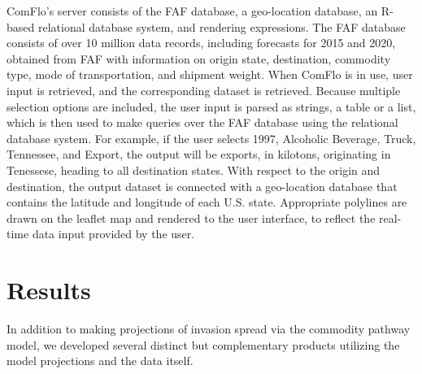 \documentclass[12pt]{article}
\begin{document}
ComFlo's server consists of the FAF database, a geo-location database, an R-based relational database system, and rendering expressions. The FAF database consists of over 10 million data records, including forecasts for 2015 and 2020, obtained from FAF with information on origin state, destination, commodity type, mode of transportation, and shipment weight. When ComFlo is in use, user input is retrieved, and the corresponding dataset is retrieved. Because multiple selection options are included, the user input is parsed as strings, a table or a list, which is then used to make queries over the FAF database using the relational database system.  For example, if the user selects 1997, Alcoholic Beverage, Truck, Tennessee, and Export, the output will be exports, in kilotons, originating in Tenessese, heading to all destination states. With respect to the origin and destination, the output dataset is connected with a geo-location database that contains the latitude and longitude of each U.S. state.  Appropriate polylines are drawn on the leaflet map and rendered to the user interface, to reflect the real-time data input provided by the user.  

\section*{Results}

In addition to making projections of invasion spread via the commodity pathway model, we developed several distinct but complementary products utilizing the model projections and the data itself.
\end{document}
